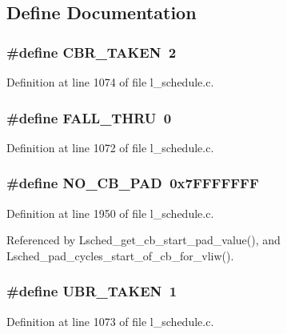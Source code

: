 \subsection{Define Documentation}
\subsubsection{\setlength{\rightskip}{0pt plus 5cm}\#define CBR\_\-TAKEN~2}\label{l__schedule_8c_87e3ac61028234f430493ba624e9c6f5}




Definition at line 1074 of file l\_\-schedule.c.
\subsubsection{\setlength{\rightskip}{0pt plus 5cm}\#define FALL\_\-THRU~0}\label{l__schedule_8c_78acf9a760383460d3aac987a8e46bd3}




Definition at line 1072 of file l\_\-schedule.c.
\subsubsection{\setlength{\rightskip}{0pt plus 5cm}\#define NO\_\-CB\_\-PAD~0x7FFFFFFF}\label{l__schedule_8c_41d6c6a83879de5e8a3c3c62532d9a4c}




Definition at line 1950 of file l\_\-schedule.c.

Referenced by Lsched\_\-get\_\-cb\_\-start\_\-pad\_\-value(), and Lsched\_\-pad\_\-cycles\_\-start\_\-of\_\-cb\_\-for\_\-vliw().
\subsubsection{\setlength{\rightskip}{0pt plus 5cm}\#define UBR\_\-TAKEN~1}\label{l__schedule_8c_9edb73b1b8df6d4ae828b11ea66b461e}




Definition at line 1073 of file l\_\-schedule.c.

